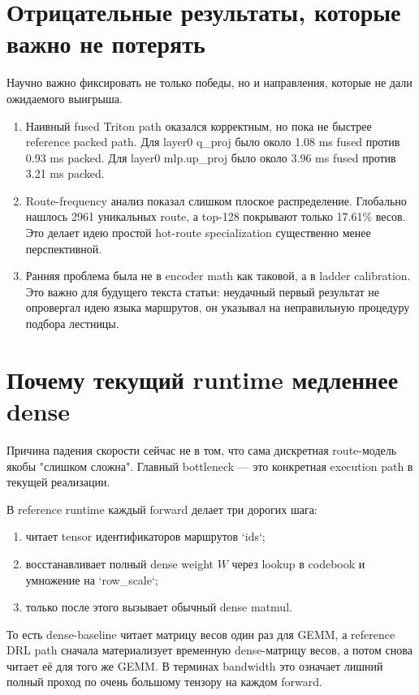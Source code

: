 \section{Отрицательные результаты, которые важно не потерять}

Научно важно фиксировать не только победы, но и направления, которые не дали
ожидаемого выигрыша.

\begin{enumerate}[leftmargin=1.7em]
\item Наивный fused Triton path оказался корректным, но пока не быстрее reference
packed path. Для layer0 q\_proj было около 1.08 ms fused против 0.93 ms packed.
Для layer0 mlp.up\_proj было около 3.96 ms fused против 3.21 ms packed.
\item Route-frequency анализ показал слишком плоское распределение. Глобально
нашлось 2961 уникальных route, а top-128 покрывают только 17.61\% весов. Это
делает идею простой hot-route specialization существенно менее перспективной.
\item Ранняя проблема была не в encoder math как таковой, а в ladder calibration.
Это важно для будущего текста статьи: неудачный первый результат не опровергал
идею языка маршрутов, он указывал на неправильную процедуру подбора лестницы.
\end{enumerate}

\section{Почему текущий runtime медленнее dense}

Причина падения скорости сейчас не в том, что сама дискретная route-модель якобы
"слишком сложна". Главный bottleneck --- это конкретная execution path в текущей
реализации.

В reference runtime каждый forward делает три дорогих шага:

\begin{enumerate}[leftmargin=1.7em]
\item читает tensor идентификаторов маршрутов `ids`;
\item восстанавливает полный dense weight $W$ через lookup в codebook и умножение
на `row_scale`;
\item только после этого вызывает обычный dense matmul.
\end{enumerate}

То есть dense-baseline читает матрицу весов один раз для GEMM, а reference DRL path
сначала материализует временную dense-матрицу весов, а потом снова читает её для
того же GEMM. В терминах bandwidth это означает лишний полный проход по очень
большому тензору на каждом forward.

